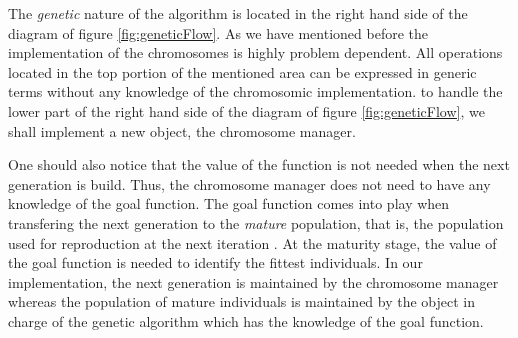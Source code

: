 \documentclass[twoside]{book}
\begin{document}
The {\sl genetic} nature of the algorithm is located in the right
hand side of the diagram of figure \ref{fig:geneticFlow}. As we
have mentioned before the implementation of the chromosomes is
highly problem dependent. All operations located in the top
portion of the mentioned area can be expressed in generic terms
without any knowledge of the chromosomic implementation. to handle
the lower part of the right hand side of the diagram of figure
\ref{fig:geneticFlow}, we shall implement a new object, the
chromosome manager.

One should also notice that the value of the function is not
needed when the next generation is build. Thus, the chromosome
manager does not need to have any knowledge of the goal function.
The goal function comes into play when transfering the next
generation to the {\sl mature} population, that is, the population
used for reproduction at the next iteration . At the maturity
stage, the value of the goal function is needed to identify the
fittest individuals. In our implementation, the next generation is
maintained by the chromosome manager whereas the population of
mature individuals is maintained by the object in charge of the
genetic algorithm which has the knowledge of the goal function.
\end{document}
